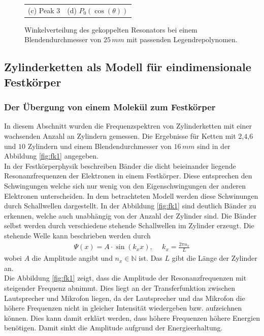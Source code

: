 \begin{figure}[H]
\begin{tabular}{cc}
  (c)  Peak 3 & (d)  $P_0(\cos(\theta))$ \\[6pt]
  \end{tabular}
  \caption{Winkelverteilung des gekoppelten Resonators bei einem Blendendurchmesser von $25\, mm$ mit passenden Legendrepolynomen.} 
  \label{fig:h2_2}
\end{figure}
\subsection{Zylinderketten als Modell für eindimensionale Festkörper}
\subsubsection{Der Übergung von einem Molekül zum Festkörper}
In diesem Abschnitt wurden die Frequenzspektren von Zylinderketten mit einer wachsenden Anzahl an Zylindern gemessen. Die Ergebnisse für Ketten mit $2$,$4$,$6$ und $10$ Zylindern und einem Blendendurchmesser von $16\, mm$ sind in der 
Abbildung \ref{fig:fk1} angegeben.\\
In der Festkörperphysik beschreiben Bänder die dicht beieinander liegende Resonanzfrequenzen der Elektronen in einem Festkörper. Diese entsprechen den Schwingungen welche sich nur wenig von den Eigenschwingungen der anderen Elektronen unterscheiden. 
In dem betrachteten Modell werden diese Schwinungen durch Schallwellen dargestellt. In der Abbildung \ref{fig:fk1} sind deutlich Bänder zu erkennen, welche auch unabhängig von der Anzahl der Zylinder sind. 
Die Bänder selbst werden durch verschiedene stehende Schallwellen im Zylinder erzeugt. Die stehende Welle kann beschrieben werden durch 
\begin{align*}
  \Psi(x) = A\cdot \sin(k_x x),  & \:\:k_x = \frac{2 \pi n_x}{L}
\end{align*}
wobei $A$ die Amplitude angibt und $n_x \in \mathbb{N}$ ist. Das $L$ gibt die Länge der Zylinder an. \\
Die Abbildung \ref{fig:fk1} zeigt, dass die Amplitude der Resonanzfrequenzen mit steigender Frequenz abnimmt. Dies liegt an der Transferfunktion zwischen Lautsprecher und Mikrofon liegen, da der Lautsprecher und das Mikrofon die höhere Frequenzen nicht in gleicher Intensität wiedergeben bzw. aufzeichnen können. 
Dies kann damit erklärt werden, dass höhere Frequenzen höhere Energien benötigen. Damit sinkt die Amplitude aufgrund der Energieerhaltung. 


